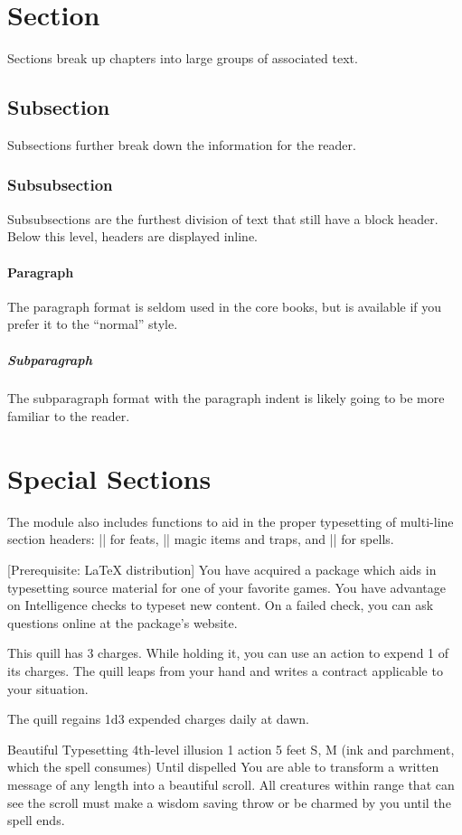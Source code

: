 \documentclass[letterpaper,twocolumn,openany,nodeprecatedcode]{dndbook}
\begin{document}
\section{Section}
Sections break up chapters into large groups of associated text.

\subsection{Subsection}
Subsections further break down the information for the reader.

\subsubsection{Subsubsection}
Subsubsections are the furthest division of text that still have a block header. Below this level, headers are displayed inline.

\paragraph{Paragraph}
The paragraph format is seldom used in the core books, but is available if you prefer it to the ``normal'' style.

\subparagraph{Subparagraph}
The subparagraph format with the paragraph indent is likely going to be more familiar to the reader.

\section{Special Sections}
The module also includes functions to aid in the proper typesetting of multi-line section headers: |\DndFeatHeader| for feats, |\DndItemHeader| magic items and traps, and |\DndSpellHeader| for spells.

[Prerequisite: \LaTeX{} distribution]
You have acquired a package which aids in typesetting source material for one of your favorite games. You have advantage on Intelligence checks to typeset new content. On a failed check, you can ask questions online at the package's website.

This quill has 3 charges. While holding it, you can use an action to expend 1 of its charges. The quill leaps from your hand and writes a contract applicable to your situation.

The quill regains 1d3 expended charges daily at dawn.

\DndSpellHeader%
  {Beautiful Typesetting}
  {4th-level illusion}
  {1 action}
  {5 feet}
  {S, M (ink and parchment, which the spell consumes)}
  {Until dispelled}
You are able to transform a written message of any length into a beautiful scroll. All creatures within range that can see the scroll must make a wisdom saving throw or be charmed by you until the spell ends.
\end{document}
